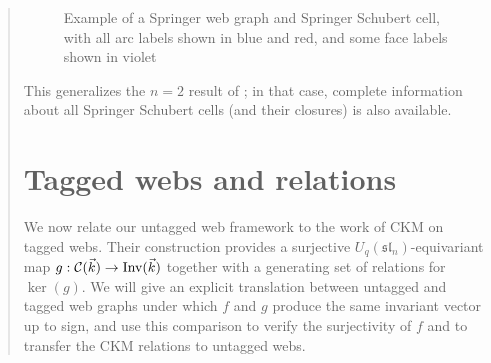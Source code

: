 \documentclass[letterpaper,11pt]{amsart}
\newcommand{\uq}{U_q(\mathfrak{sl}_n)} %
\begin{document}
\begin{abstract}
\begin{figure}[h]
 \hspace{0.25in}
\caption{Example of a Springer web graph and Springer Schubert cell, with all arc labels shown in blue and red, and some face labels shown in violet} \label{figure: example of Springer web graph and Schubert cell}
\end{figure}

This generalizes the $n=2$ result of \cite{GNST}; in that case, complete information about all Springer Schubert cells (and their closures) is also available.
 
 
\section{Tagged webs and relations}\label{section:tagless vs tagged}
 
We now relate our untagged web framework to the work of CKM \cite{CKM} on tagged webs. Their construction provides a surjective $\uq$-equivariant map $g:\mathcal{C}(\vec{k})\to\textup{Inv}(\vec{k})$ together with a generating set of relations for $\ker(g)$. We will give an explicit translation between untagged and tagged web graphs under which $f$ and $g$ produce the same invariant vector up to sign, and use this comparison to verify the surjectivity of $f$ and to transfer the CKM relations to untagged webs.
 

\end{abstract}
\end{document}
